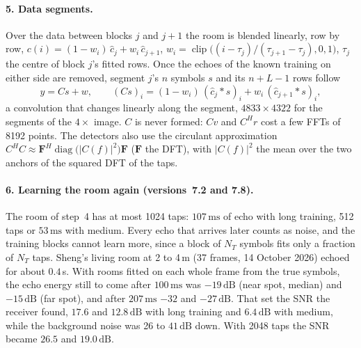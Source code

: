 \documentclass[11pt,a4paper]{article}
\newcommand{\ms}{\,\mathrm{ms}}
\newcommand{\dB}{\,\mathrm{dB}}
\newcommand{\clip}{\operatorname{clip}}
\theoremstyle{remark}
\begin{document}
\paragraph{5. Data segments.}
Over the data between blocks $j$ and $j+1$ the room is blended linearly, row by row, $c(i) = (1 - w_i)\,\hat c_j + w_i\, \hat c_{j+1}$, $w_i = \clip\bigl((i - \tau_j)/(\tau_{j+1} - \tau_j), 0, 1\bigr)$, $\tau_j$ the centre of block $j$'s fitted rows. Once the echoes of the known training on either side are removed, segment $j$'s $n$ symbols $s$ and its $n + L - 1$ rows follow
\begin{equation}
y = C s + w, \qquad (C s)_i = (1 - w_i)\,(\hat c_j * s)_i + w_i\,(\hat c_{j+1} * s)_i,
\label{eq:scmodel}
\end{equation}
a convolution that changes linearly along the segment, $4833 \times 4322$ for the segments of the $4\times$ image. $C$ is never formed: $Cv$ and $C^H r$ cost a few FFTs of 8192 points. The detectors also use the circulant approximation $C^H C \approx \mathbf F^H \operatorname{diag}\bigl(|C(f)|^2\bigr) \mathbf F$ ($\mathbf F$ the DFT), with $|C(f)|^2$ the mean over the two anchors of the squared DFT of the taps.

\paragraph{6. Learning the room again (versions~7.2 and 7.8).}
\label{sec:screlearn}
The room of step~4 has at most 1024 taps: $107\ms$ of echo with long training, 512 taps or $53\ms$ with medium. Every echo that arrives later counts as noise, and the training blocks cannot learn more, since a block of $N_T$ symbols fits only a fraction of $N_T$ taps. Sheng's living room at 2 to 4\,m (37 frames, 14 October 2026) echoed for about $0.4$\,s. With rooms fitted on each whole frame from the true symbols, the echo energy still to come after $100\ms$ was $-19\dB$ (near spot, median) and $-15\dB$ (far spot), and after $207\ms$ $-32$ and $-27\dB$. That set the SNR the receiver found, $17.6$ and $12.8\dB$ with long training and $6.4\dB$ with medium, while the background noise was 26 to $41\dB$ down. With 2048 taps the SNR became $26.5$ and $19.0\dB$.
\end{document}
